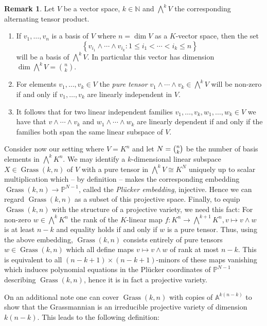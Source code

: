 \documentclass[
  paper=a4,
  titlepage,
  bibliography=totoc,
  pagesize=pdftex
]{scrartcl}
\numberwithin{figure}{section}
\numberwithin{equation}{section}
\numberwithin{table}{section}
\newcommand*\setN{\mathds{N}}
\newcommand*\setA{\mathds{A}}
\newcommand*\setP{\mathds{P}}
\DeclareMathOperator{\Grass}{Grass}
\theoremstyle{definition}
\newtheorem{remark}[definition]{Remark}
\numberwithin{definition}{section}
\begin{document}
\begin{remark}
  Let $V$ be a vector space, $k \in \setN$ and $\bigwedge^k V$ the corresponding
  alternating tensor product.
  \begin{enumerate}
    \item If $v_1, \dots, v_n$ is a basis of $V$ where $n=\dim V$ as a $K$-vector space,
      then the set
      \[
        \left\{
          v_{i_1} \wedge \cdots \wedge v_{i_k} : 1\leq i_1 < \cdots < i_k \leq n
        \right\}
      \]
      will be a basis of $\bigwedge^kV$. In particular this vector has dimension
      $\dim\bigwedge^kV = \binom nk$.
    \item For elements $v_1, \dots, v_k \in V$ the \emph{pure tensor} $v_1\wedge \cdots
      \wedge v_k \in \bigwedge^kV$ will be non-zero if and only if $v_1, \dots, v_k$ are
      linearly independent in $V$.
    \item It follows that for two linear independent families $v_1, \dots, v_k, w_1,
      \dots, w_k \in V$ we have that $v\wedge\cdots \wedge v_k$ and $w_1\wedge\cdots\wedge
      w_k$ are linearly dependent if and only if the families both span the same linear
      subspace of $V$.
  \end{enumerate}
\end{remark}

Consider now our setting where $V=K^n$ and let $N = \smash{\binom nk}$ be the number of
basis elements in $\bigwedge^kK^n$. We may identify a $k$-dimensional linear subspace $X
\in \Grass(k,n)$ of $V$ with a pure tensor in $\bigwedge^kV \cong K^N$ uniquely up to
scalar multiplication which -- by definition -- makes the corresponding embedding
$\Grass(k,n) \to \setP^{N-1}$, called the \emph{Plücker embedding}, injective. Hence we
can regard $\Grass(k,n)$ as a subset of this projective space. Finally, to equip
$\Grass(k,n)$ with the structure of a projective variety, we need this fact: For non-zero
$w\in \bigwedge^kK^n$ the rank of the $K$-linear map $f:K^n \to \bigwedge^{k+1}K^n, v
\mapsto v \wedge w$ is at least $n-k$ and equality holds if and only if $w$ is a pure
tensor. Thus, using the above embedding, $\Grass(k,n)$ consists entirely of pure tensors
$w\in \Grass(k,n)$ which all define maps $v\mapsto v\wedge w$ of rank at most $n-k$. This
is equivalent to all $(n-k+1) \times (n-k+1)$-minors of these maps vanishing which induces
polynomial equations in the Plücker coordinates of $\setP^{N-1}$ describing $\Grass(k,n)$,
hence it is in fact a projective variety.

On an additional note one can cover $\Grass(k,n)$ with copies of $\setA^{k(n-k)}$ to show
that the Grassmannian is an irreducible projective variety of dimension $k(n-k)$. This
leads to the following definition:
\end{document}
